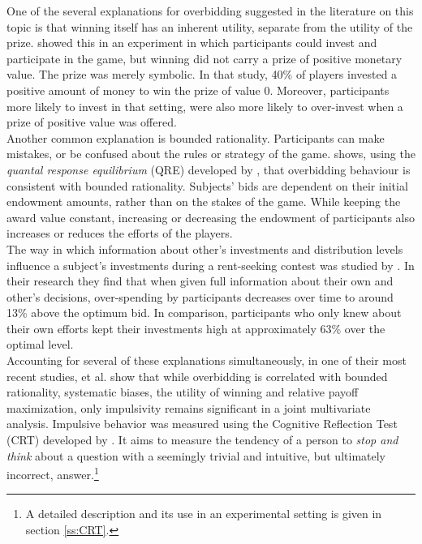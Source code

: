 One of the several explanations for overbidding suggested in the literature on this topic is that winning itself has an inherent utility, separate from the utility of the prize. \cite{sheremeta2010} showed this in an experiment in which participants could invest and participate in the game, but winning did not carry a prize of positive monetary value. The prize was merely symbolic. In that study, 40\% of players invested a positive amount of money to win the prize of value 0. Moreover, participants more likely to invest in that setting, were also more likely to over-invest when a prize of positive value was offered.\\

Another common explanation is bounded rationality. Participants can make mistakes, or be confused about the rules or strategy of the game. \cite{sheremeta2011} shows, using the \textit{quantal response equilibrium} (QRE) developed by \cite{mckelvey1995}, that overbidding behaviour is consistent with bounded rationality. Subjects' bids are dependent on their initial endowment amounts, rather than on the stakes of the game. While keeping the award value constant, increasing or decreasing the endowment of participants also increases or reduces the efforts of the players.\\ 

The way in which information about other's investments and distribution levels influence a subject's investments during a rent-seeking contest was studied by \cite{fallucchi2013}. In their research they find that when given full information about their own and other's decisions, over-spending by participants decreases over time to around 13\% above the optimum bid. In comparison, participants who only knew about their own efforts kept their investments high at approximately 63\% over the optimal level.\\

Accounting for several of these explanations simultaneously, in one of their most recent studies, \cite{sheremeta2016} et al. show that while overbidding is correlated with bounded rationality, systematic biases, the utility of winning and relative payoff maximization, only impulsivity remains significant in a joint multivariate analysis. Impulsive behavior was measured using the Cognitive Reflection Test (CRT) developed by \cite{frederick2005}. It aims to measure the tendency of a person to \textit{stop and think} about a question with a seemingly trivial and intuitive, but ultimately incorrect, answer.\footnote{A detailed description and its use in an experimental setting is given in section \ref{ss:CRT}.}\\

